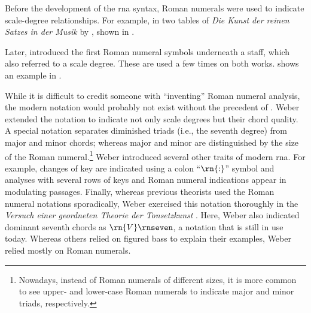 



Before the development of the \gls{rna} syntax, Roman
numerals were used to indicate scale-degree relationships.
For example, in two tables of \emph{Die Kunst der reinen
Satzes in der Musik} by \textcite{kirnberger1774kunst},
shown in .


Later, \textcite{vogler1778grunde, vogler1802handbuch}
introduced the first Roman numeral symbols underneath a
staff, which also referred to a scale degree. These are used
a few times on both works.
 shows an
example in \textcite{vogler1778grunde}.

While it is difficult to credit someone with ``inventing''
Roman numeral analysis, the modern notation would probably
not exist without the precedent of
\textcite{weber1817versuch}. Weber extended the notation to
indicate not only scale degrees but their chord quality. A
special notation separates diminished triads (i.e., the
seventh degree) from major and minor chords; whereas major
and minor are distinguished by the size of the Roman
numeral.\footnote{Nowadays, instead of Roman numerals of
different sizes, it is more common to see upper- and
lower-case Roman numerals to indicate major and minor
triads, respectively.} Weber introduced several other traits
of modern \gls{rna}. For example, changes of key are
indicated using a colon ``$\rn{:}$'' symbol and analyses
with several rows of keys and Roman numeral indications
appear in modulating passages. Finally, whereas previous
theorists used the Roman numeral notations sporadically,
Weber exercised this notation thoroughly in the
\emph{Versuch einer geordneten Theorie der Tonsetzkunst}
\parencite{weber1817versuch}. Here, Weber also indicated
dominant seventh chords as $\rn{V}\rnseven$, a notation that
is still in use today. Whereas others relied on figured bass
to explain their examples, Weber relied mostly on Roman
numerals.

